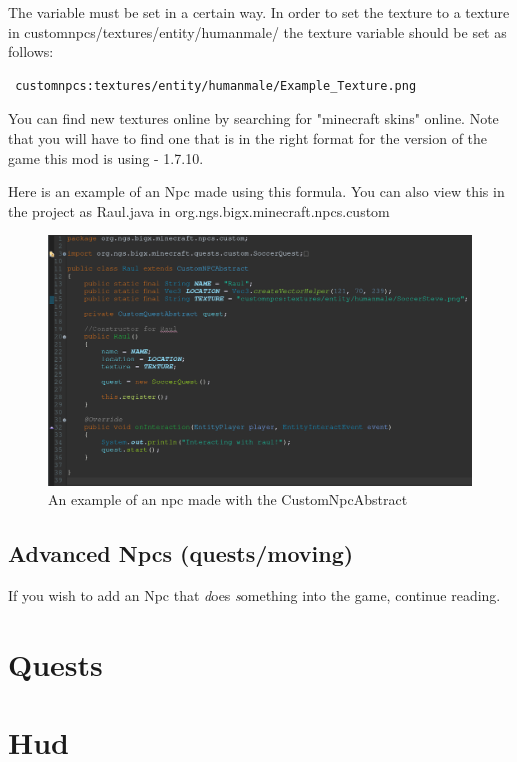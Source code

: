 \documentclass[12pt]{article}
\begin{document}
The variable must be set in a certain way. In order to set the texture to a texture in customnpcs/textures/entity/humanmale/ the texture variable should be set as follows: \begin{verbatim} customnpcs:textures/entity/humanmale/Example_Texture.png \end{verbatim}

You can find new textures online by searching for "minecraft skins" online. Note that you will have to find one that is in the right format for the version of the game this mod is using - 1.7.10.

Here is an example of an Npc made using this formula. You can also view this in the project as Raul.java in org.ngs.bigx.minecraft.npcs.custom

\begin{figure}[h]
	\caption{An example of an npc made with the CustomNpcAbstract}
	\includegraphics[scale=0.3]{images/npcs/Raul_Java.png}
	\centering
\end{figure}

\subsection{Advanced Npcs (quests/moving)}

If you wish to add an Npc that {\emph does \emph something} into the game, continue reading.

\section{Quests}
\label{sec:quests}

\section{Hud}
\label{sec:hud}
\end{document}
